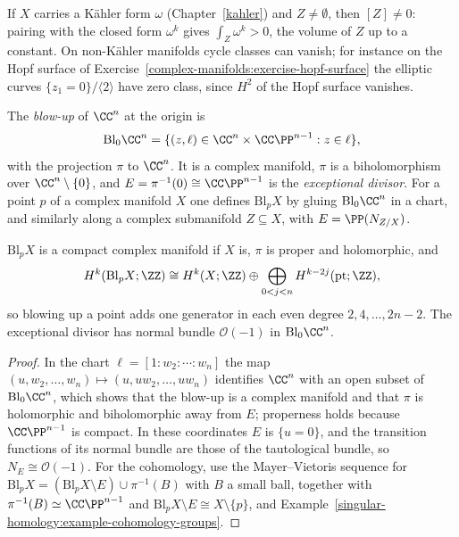 \begin{remark}\label{complex-manifolds:remark-cycle-class-nonzero}
If $X$ carries a K\"ahler form $\omega$ (Chapter~\ref{kahler}) and $Z \neq \emptyset$, then $[Z] \neq 0$: pairing with the closed form $\omega^k$ gives $\int_Z\omega^k > 0$, the volume of $Z$ up to a constant.
On non-K\"ahler manifolds cycle classes can vanish; for instance on the Hopf surface of Exercise~\ref{complex-manifolds:exercise-hopf-surface} the elliptic curves $\{z_1 = 0\}/\langle 2 \rangle$ have
zero class, since $H^2$ of the Hopf surface vanishes.
\end{remark}

\begin{definition}\label{complex-manifolds:definition-blowup}
The \emph{blow-up} of $\CC^n$ at the origin is
\[
\mathrm{Bl}_0\CC^n = \{(z, \ell) \in \CC^n \times \CC\PP^{n-1} : z \in \ell\},
\]
with the projection $\pi$ to $\CC^n$. It is a complex manifold, $\pi$ is a biholomorphism over $\CC^n \setminus \{0\}$, and $E = \pi^{-1}(0) \cong \CC\PP^{n-1}$ is the \emph{exceptional divisor}. For a point $p$ of
a complex manifold $X$ one defines $\mathrm{Bl}_pX$ by gluing $\mathrm{Bl}_0\CC^n$ in a chart, and similarly along a complex submanifold $Z \subseteq X$, with $E = \PP(N_{Z/X})$.
\end{definition}

\begin{proposition}\label{complex-manifolds:proposition-blowup}
$\mathrm{Bl}_pX$ is a compact complex manifold if $X$ is, $\pi$ is proper and holomorphic, and
\[
H^k(\mathrm{Bl}_pX; \ZZ) \cong H^k(X; \ZZ) \oplus \bigoplus_{0 < j < n} H^{k-2j}(\mathrm{pt}; \ZZ),
\]
so blowing up a point adds one generator in each even degree $2, 4, \ldots, 2n-2$. The exceptional divisor has normal bundle $\mathcal{O}(-1)$ in $\mathrm{Bl}_0\CC^n$.
\end{proposition}

\begin{proof}
In the chart $\ell = [1 : w_2 : \cdots : w_n]$ the map $(u, w_2, \ldots, w_n) \mapsto (u, uw_2, \ldots, uw_n)$ identifies $\CC^n$ with an open subset of $\mathrm{Bl}_0\CC^n$, which shows that the blow-up is a complex
manifold and that $\pi$ is holomorphic and biholomorphic away from $E$; properness holds because $\CC\PP^{n-1}$ is compact. In these coordinates $E$ is $\{u = 0\}$, and the transition functions of its
normal bundle are those of the tautological bundle, so $N_{E} \cong \mathcal{O}(-1)$. For the cohomology, use the Mayer--Vietoris sequence for $\mathrm{Bl}_pX = (\mathrm{Bl}_pX \setminus E) \cup \pi^{-1}(B)$ with
$B$ a small ball, together with $\pi^{-1}(B) \simeq \CC\PP^{n-1}$ and $\mathrm{Bl}_pX \setminus E \cong X \setminus \{p\}$, and Example~\ref{singular-homology:example-cohomology-groups}.
\end{proof}

